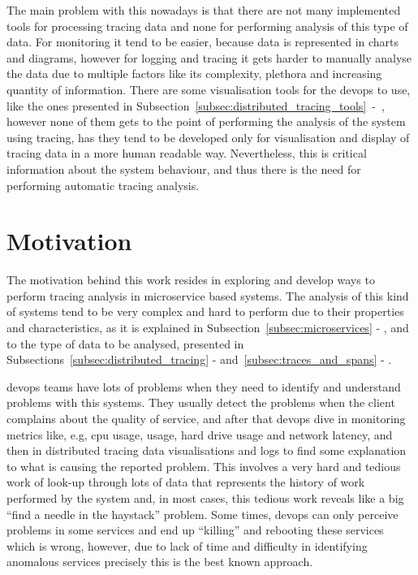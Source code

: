 The main problem with this nowadays is that there are not many implemented tools for processing tracing data and none for performing analysis of this type of data. For monitoring it tend to be easier, because data is represented in charts and diagrams, however for logging and tracing it gets harder to manually analyse the data due to multiple factors like its complexity, plethora and increasing quantity of information. There are some visualisation tools for the \gls{devops} to use, like the ones presented in Subsection~\ref{subsec:distributed_tracing_tools}~-~, however none of them gets to the point of performing the analysis of the system using tracing, has they tend to be developed only for visualisation and display of tracing data in a more human readable way. Nevertheless, this is critical information about the system behaviour, and thus there is the need for performing automatic tracing analysis.

\section{Motivation}
\label{sec:motivation}

The motivation behind this work resides in exploring and develop ways to perform tracing analysis in microservice based systems. The analysis of this kind of systems tend to be very complex and hard to perform due to their properties and characteristics, as it is explained in Subsection~\ref{subsec:microservices} - , and to the type of data to be analysed, presented in Subsections~\ref{subsec:distributed_tracing} -  and~\ref{subsec:traces_and_spans} - .

\gls{devops} teams have lots of problems when they need to identify and understand problems with this systems. They usually detect the problems when the client complains about the quality of service, and after that \gls{devops} dive in monitoring metrics like, e.g, \gls{cpu} usage, usage, hard drive usage and network latency, and then in distributed tracing data visualisations and logs to find some explanation to what is causing the reported problem. This involves a very hard and tedious work of look-up through lots of data that represents the history of work performed by the system and, in most cases, this tedious work reveals like a big ``find a needle in the haystack'' problem. Some times, \gls{devops} can only perceive problems in some services and end up ``killing'' and rebooting these services which is wrong, however, due to lack of time and difficulty in identifying anomalous services precisely this is the best known approach.

